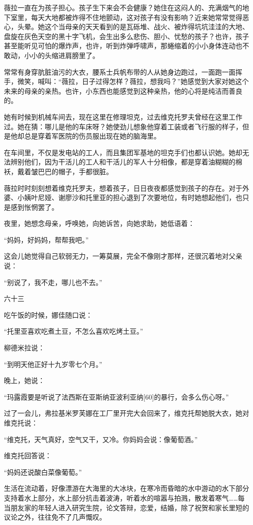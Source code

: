 薇拉一直在为孩子担心。孩子生下来会不会健康？她住在这闷人的、充满烟气的地下室里，每天大地都被炸得不住地颤动，这对孩子有没有影响？近来她常常觉得恶心，头晕。她这个当母亲的天天看到的是瓦砾堆、战火、被炸得坑坑洼洼的大地、盘旋在灰色天空的黑十字飞机，会生出多么悲伤、胆小、忧愁的孩子？也许，孩子甚至能听见可怕的爆炸声，也许，听到炸弹呼啸声，那蜷缩着的小小身体连动也不敢动，小小的头缩进肩膀里了。

常常有身穿肮脏油污的大衣，腰系士兵帆布带的人从她身边跑过，一面跑一面挥手，微笑，喊叫：“薇拉，日子过得怎样？薇拉，想我吗？”她感觉到大家对她这个未来的母亲的亲热。也许，小东西也能感觉到这种亲热，他的心将是纯洁而善良的。

她有时候到机械车间去，现在这里在修理坦克，过去维克托罗夫曾经在这里工作过。她在猜：哪儿是他的车床呀？她使劲儿想象他穿着工装或者飞行服的样子，但是他却总是穿着军医院的伤员服出现在她的脑海里。

在车间里，不仅是发电站的工人，而且集团军基地的坦克手们也都认识她。她却无法辨别他们，因为干活儿的工人和干活儿的军人十分相像，都是穿着油糊糊的棉袄，戴着皱巴巴的帽子，手都很脏。

薇拉时时刻刻想着维克托罗夫，想着孩子，日日夜夜都感觉到孩子的存在。对于外婆、小姨叶尼娅、谢廖沙和托里亚的担心退到了次要地位，有时她想起他们，也只是感到怅惘罢了。

夜里，她想念母亲，呼唤她，向她诉苦，向她求助，她低语着：

“妈妈，好妈妈，帮帮我吧。”

这会儿她觉得自己软弱无力，一筹莫展，完全不像刚才那样，还很沉着地对父亲说：

“别说了，我不走，哪儿也不去。”

六十三

吃午饭的时候，娜佳随口说：

“托里亚喜欢吃煮土豆，不怎么喜欢吃烤土豆。”

柳德米拉说：

“到明天他正好十九岁零七个月。”

晚上，她说：

“玛露霞要是听说了法西斯在亚斯纳亚波利亚纳[60]的暴行，会多么伤心呀。”

过了一会儿，弗拉基米罗芙娜在工厂里开完大会回来了，维克托帮她脱大衣，她对维克托说：

“维克托，天气真好，空气又干，又冷。你妈妈会说：像葡萄酒。”

维克托回答说：

“妈妈还说酸白菜像葡萄。”

生活在流动着，好像漂游在大海里的大冰块，在寒冷而昏暗的水中游动的水下部分支持着水上部分，水上部分抗击着波涛，听着水的喧嚣与拍溅，散发着寒气……每当朋友家的年轻人进入研究生院，论文答辩，恋爱，结婚，除了祝贺和家长里短的议论之外，往往免不了几声慨叹。

